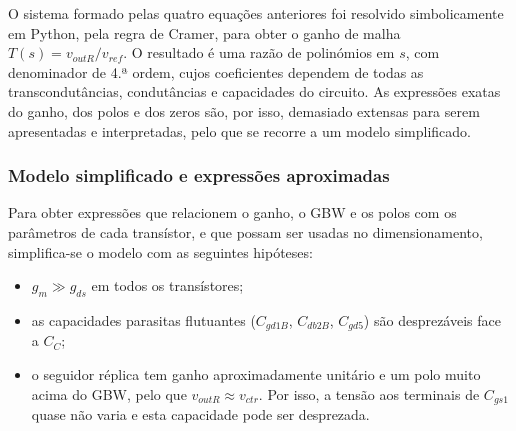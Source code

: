 O sistema formado pelas quatro equações anteriores foi resolvido simbolicamente em Python, pela regra de Cramer,
para obter o ganho de malha $T(s) = v_{outR}/v_{ref}$.
O resultado é uma razão de polinómios em $s$, com denominador de 4.ª ordem, cujos coeficientes
dependem de todas as transcondutâncias, condutâncias e capacidades do circuito.
As expressões exatas do ganho, dos polos e dos zeros são, por isso, demasiado extensas para serem
apresentadas e interpretadas, pelo que se recorre a um modelo simplificado.

\subsubsection{Modelo simplificado e expressões aproximadas}
\label{subsubsec:aproximadas}

Para obter expressões que relacionem o ganho, o GBW e os polos com os parâmetros de cada transístor, e que possam ser
usadas no dimensionamento, simplifica-se o modelo com as seguintes hipóteses:
\begin{itemize}
    \item $g_m \gg g_{ds}$ em todos os transístores;
    \item as capacidades parasitas flutuantes ($C_{gd1B}$, $C_{db2B}$, $C_{gd5}$) são desprezáveis face a $C_C$;
    \item o seguidor réplica tem ganho aproximadamente unitário e um polo muito acima do GBW, pelo que $v_{outR} \approx v_{ctr}$.
    Por isso, a tensão aos terminais de $C_{gs1}$ quase não varia e esta capacidade pode ser desprezada.
\end{itemize}

